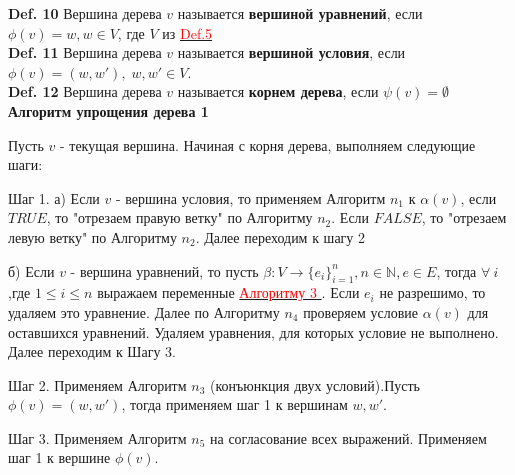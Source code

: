 \documentclass[12pt]{article}
\begin{document}
     {\bf Def. 10} Вершина дерева $v$ называется {\bf вершиной уравнений}, если
     $\phi(v)=w , w \in V$, где $V$ из \hyperlink{d5}{ \textcolor{red}{Def.5}}
     \\
     
     {\bf Def. 11} Вершина дерева $v$ называется {\bf вершиной условия}, если
     $\phi(v)=(w,w') ,\; w,w' \in V$.
     \\
     
     {\bf Def. 12}  Вершина дерева $v$ называется {\bf корнем дерева}, если
      $\psi(v) = \emptyset$ 
      \\
      
     {\bf Алгоритм упрощения дерева 1} 
     
     Пусть $v$ - текущая вершина.
     Начиная с корня дерева, выполняем следующие шаги:
     
     Шаг 1. а) Если $v$ - вершина условия, то применяем Алгоритм $n_{1}$ к  $\alpha(v)$, если $TRUE$, то "отрезаем правую ветку" по Алгоритму $n_{2}$. Если $FALSE$, то "отрезаем левую ветку" по Алгоритму $n_{2}$. Далее переходим к шагу 2
     
     б) Если $v$ - вершина уравнений, то пусть $\beta : V \rightarrow \lbrace  e_{i}  \rbrace_{i=1}^{n}, n \in \mathbb{N}, e \in E$, тогда $\forall \: i$,где $ 1 \leq i \leq n$ выражаем переменные \hyperlink{a3}{ \textcolor{red}{Алгоритму 3 }}. Если $e_{i} $ не разрешимо, то удаляем это уравнение. Далее по Алгоритму $n_{4}$ проверяем условие $\alpha(v)$ для оставшихся уравнений. Удаляем уравнения, для которых условие не выполнено. Далее переходим к Шагу 3.
          
     Шаг 2. Применяем  Алгоритм $n_{3}$ (конъюнкция двух условий).Пусть $\phi(v)=(w,w')$, тогда применяем шаг 1 к вершинам $w, w'$.
     
     Шаг 3. Применяем  Алгоритм $n_{5}$ на согласование  всех выражений. Применяем шаг 1 к вершине $\phi(v)$.
     
     
     
     
     
     
     
\end{document}
